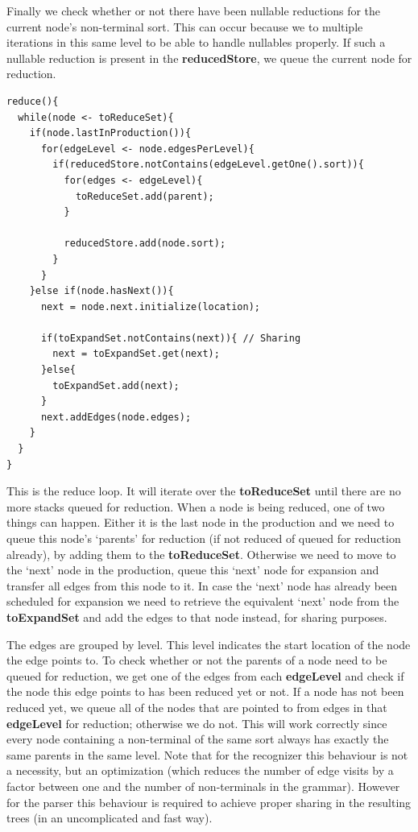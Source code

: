 \documentclass[a4paper,10pt]{article}
\begin{document}
Finally we check whether or not there have been nullable reductions for the current node's non-terminal sort. This can occur because we to multiple iterations in this same level to be able to handle nullables properly. If such a nullable reduction is present in the {\bf reducedStore}, we queue the current node for reduction.

\pagebreak
{\small
\begin{verbatim}
reduce(){
  while(node <- toReduceSet){
    if(node.lastInProduction()){
      for(edgeLevel <- node.edgesPerLevel){
        if(reducedStore.notContains(edgeLevel.getOne().sort)){
          for(edges <- edgeLevel){
            toReduceSet.add(parent);
          }
          
          reducedStore.add(node.sort);
        }
      }
    }else if(node.hasNext()){
      next = node.next.initialize(location);
      
      if(toExpandSet.notContains(next)){ // Sharing
        next = toExpandSet.get(next);
      }else{
        toExpandSet.add(next);
      }
      next.addEdges(node.edges);
    }
  }
}
\end{verbatim}
}

This is the reduce loop. It will iterate over the {\bf toReduceSet} until there are no more stacks queued for reduction. When a node is being reduced, one of two things can happen. Either it is the last node in the production and we need to queue this node's `parents' for reduction (if not reduced of queued for reduction already), by adding them to the {\bf toReduceSet}. Otherwise we need to move to the `next' node in the production, queue this `next' node for expansion and transfer all edges from this node to it. In case the `next' node has already been scheduled for expansion we need to retrieve the equivalent `next' node from the {\bf toExpandSet} and add the edges to that node instead, for sharing purposes.

The edges are grouped by level. This level indicates the start location of the node the edge points to. To check whether or not the parents of a node need to be queued for reduction, we get one of the edges from each {\bf edgeLevel} and check if the node this edge points to has been reduced yet or not. If a node has not been reduced yet, we queue all of the nodes that are pointed to from edges in that {\bf edgeLevel} for reduction; otherwise we do not. This will work correctly since every node containing a non-terminal of the same sort always has exactly the same parents in the same level. Note that for the recognizer this behaviour is not a necessity, but an optimization (which reduces the number of edge visits by a factor between one and the number of non-terminals in the grammar). However for the parser this behaviour is required to achieve proper sharing in the resulting trees (in an uncomplicated and fast way).
\end{document}

